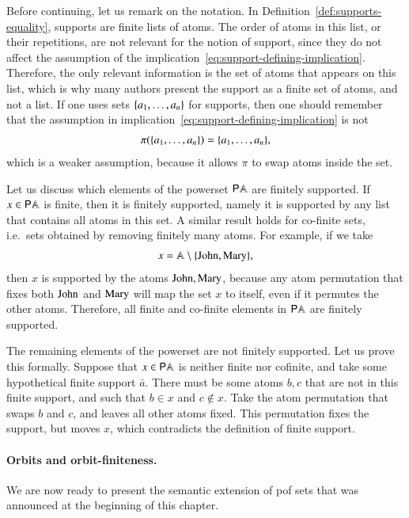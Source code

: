 Before continuing, let us remark on the notation. In Definition~\ref{def:supports-equality}, supports are finite lists of atoms. The order of atoms in this list, or their repetitions, are not relevant for the notion of support, since they do not affect the assumption of the implication~\eqref{eq:support-defining-implication}. Therefore, the only relevant information is the set of atoms that appears on this list, which is why many authors present the support as a  finite set of atoms, and not a list. If one uses sets $\{a_1,\ldots,a_n\}$ for supports, then one should remember that the assumption in implication~\eqref{eq:support-defining-implication} is not
\begin{align*}
    \pi(\{a_1,\ldots,a_n\}) = \{a_1,\ldots,a_n\},
\end{align*}
which is a weaker assumption, because it allows $\pi$ to swap atoms inside the set.



\begin{myexample}
    Let us discuss which elements of the powerset ${\mathsf P} \mathbb A$ are finitely supported. If $x \in {\mathsf P} \mathbb A$ is finite, then it is finitely  supported, namely it is supported by any list that contains all atoms in this set. A similar result holds for co-finite sets, i.e.~sets obtained by removing finitely many atoms. For example, if we take 
    \begin{align*}
    x = \mathbb A \setminus \{\text{John},\text{Mary}\},
    \end{align*}
    then  $x$ is  supported by the atoms $\text{John},\text{Mary}$, because any atom permutation that fixes both $\text{John}$ and $\text{Mary}$ will map the set $x$ to itself, even if it permutes the other atoms. Therefore, all finite and co-finite elements in ${\mathsf P} \mathbb A$ are finitely supported. 

    The remaining elements of the powerset are not finitely supported.  Let us prove this formally. Suppose that $x \in {\mathsf P} \mathbb A$ is neither finite nor cofinite, and take some hypothetical finite support $\bar a$. There must be some atoms $b,c$ that are not in this finite support, and such that $b \in x$ and $c \not \in x$. Take the atom permutation that swaps $b$ and $c$, and leaves all other atoms fixed. This permutation fixes the support, but moves $x$, which contradicts the definition of finite support.
\end{myexample}

\paragraph*{Orbits and orbit-finiteness.} We are now ready to present  the semantic extension of pof sets that was announced at the beginning of this chapter. 


